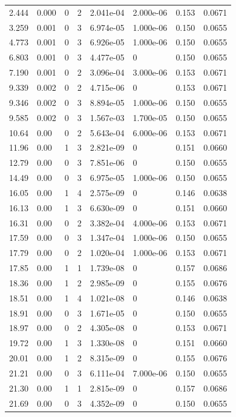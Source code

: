 \documentclass[preview]{standalone}
\begin{document}
{{\begin{tabular}{L{1.2cm}C{1.2cm} C{0.3cm}C{0.5cm} C{1.4cm}C{1.4cm} C{1.4cm}C{1.4cm}}
  2.444  &  0.000  & 0     &  2 &  2.041e-04  & 2.000e-06  & 0.153 &  0.0671   \\ 
  3.259  &  0.001  & 0     &  3 &  6.974e-05  & 1.000e-06  & 0.150 &  0.0655   \\ 
  4.773  &  0.001  & 0     &  3 &  6.926e-05  & 1.000e-06  & 0.150 &  0.0655   \\ 
  6.803  &  0.001  & 0     &  3 &  4.477e-05  & 0  & 0.150 &  0.0655   \\ 
  7.190  &  0.001  & 0     &  2 &  3.096e-04  & 3.000e-06  & 0.153 &  0.0671   \\ 
  9.339  &  0.002  & 0     &  2 &  4.715e-06  & 0  & 0.153 &  0.0671   \\ 
  9.346  &  0.002  & 0     &  3 &  8.894e-05  & 1.000e-06  & 0.150 &  0.0655   \\ 
  9.585  &  0.002  & 0     &  3 &  1.567e-03  & 1.700e-05  & 0.150 &  0.0655   \\ 
  10.64  &  0.00  & 0     &  2 &  5.643e-04  & 6.000e-06  & 0.153 &  0.0671   \\ 
  11.96  &  0.00  & 1     &  3 &  2.821e-09  & 0  & 0.151 &  0.0660   \\ 
  12.79  &  0.00  & 0     &  3 &  7.851e-06  & 0  & 0.150 &  0.0655   \\ 
  14.49  &  0.00  & 0     &  3 &  6.975e-05  & 1.000e-06  & 0.150 &  0.0655   \\ 
  16.05  &  0.00  & 1     &  4 &  2.575e-09  & 0  & 0.146 &  0.0638   \\ 
  16.13  &  0.00  & 1     &  3 &  6.630e-09  & 0  & 0.151 &  0.0660   \\ 
  16.31  &  0.00  & 0     &  2 &  3.382e-04  & 4.000e-06  & 0.153 &  0.0671   \\ 
  17.59  &  0.00  & 0     &  3 &  1.347e-04  & 1.000e-06  & 0.150 &  0.0655   \\ 
  17.79  &  0.00  & 0     &  2 &  1.020e-04  & 1.000e-06  & 0.153 &  0.0671   \\ 
  17.85  &  0.00  & 1     &  1 &  1.739e-08  & 0  & 0.157 &  0.0686   \\ 
  18.36  &  0.00  & 1     &  2 &  2.985e-09  & 0  & 0.155 &  0.0676   \\ 
  18.51  &  0.00  & 1     &  4 &  1.021e-08  & 0  & 0.146 &  0.0638   \\ 
  18.91  &  0.00  & 0     &  3 &  1.671e-05  & 0  & 0.150 &  0.0655   \\ 
  18.97  &  0.00  & 0     &  2 &  4.305e-08  & 0  & 0.153 &  0.0671   \\ 
  19.72  &  0.00  & 1     &  3 &  1.330e-08  & 0  & 0.151 &  0.0660   \\ 
  20.01  &  0.00  & 1     &  2 &  8.315e-09  & 0  & 0.155 &  0.0676   \\ 
  21.21  &  0.00  & 0     &  3 &  6.111e-04  & 7.000e-06  & 0.150 &  0.0655   \\ 
  21.30  &  0.00  & 1     &  1 &  2.815e-09  & 0  & 0.157 &  0.0686   \\ 
  21.69  &  0.00  & 0     &  3 &  4.352e-09  & 0  & 0.150 &  0.0655   \\ 
\hline 
\end{tabular} 

}}
\end{document}
